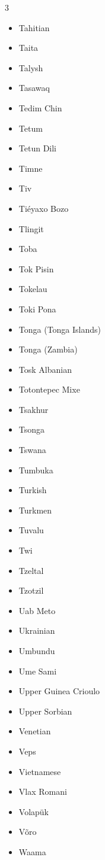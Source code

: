 \documentclass[paper=a4, 10pt]{scrbook}
\begin{document}
\begin{multicols}{3}
\begin{itemize}
        \item Tahitian
        \item Taita
        \item Talysh
        \item Tasawaq
        \item Tedim Chin
        \item Tetum
        \item Tetun Dili
        \item Timne
        \item Tiv
        \item Tiéyaxo Bozo
        \item Tlingit
        \item Toba
        \item Tok Pisin
        \item Tokelau
        \item Toki Pona
        \item Tonga (Tonga Islands)
        \item Tonga (Zambia)
        \item Tosk Albanian
        \item Totontepec Mixe
        \item Tsakhur
        \item Tsonga
        \item Tswana
        \item Tumbuka
        \item Turkish
        \item Turkmen
        \item Tuvalu
        \item Twi
        \item Tzeltal
        \item Tzotzil
        \item Uab Meto
        \item Ukrainian
        \item Umbundu
        \item Ume Sami
        \item Upper Guinea Crioulo
        \item Upper Sorbian
        \item Venetian
        \item Veps
        \item Vietnamese
        \item Vlax Romani
        \item Volapük
        \item Võro
        \item Waama

\end{itemize}
\end{multicols}
\end{document}
